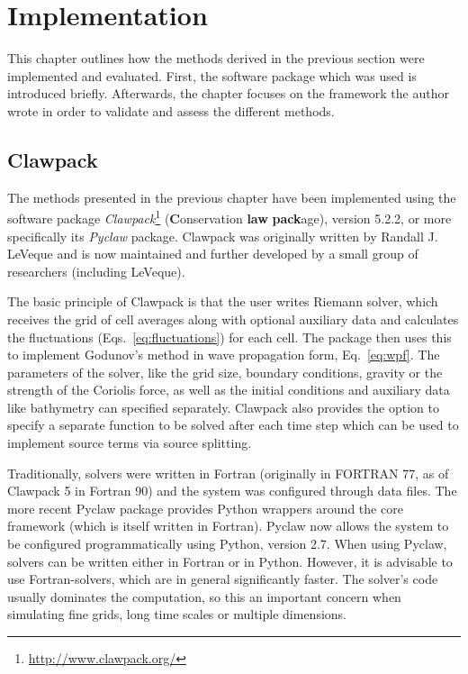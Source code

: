 \chapter{Implementation}
\label{ch:implementation}

This chapter outlines how the methods derived in the previous section were implemented and evaluated. First, the software package which was used is introduced briefly. Afterwards, the chapter focuses on the framework the author wrote in order to validate and assess the different methods.

\section{Clawpack}

The methods presented in the previous chapter have been implemented using the software package \emph{Clawpack}\footnote{\url{http://www.clawpack.org/}} (\textbf{C}onservation \textbf{law} \textbf{pack}age), version 5.2.2, or more specifically its \emph{Pyclaw} package. Clawpack was originally written by Randall J. LeVeque and is now maintained and further developed by a small group of researchers (including LeVeque).

The basic principle of Clawpack is that the user writes Riemann solver, which receives the grid of cell averages along with optional auxiliary data and calculates the fluctuations (Eqs.~\ref{eq:fluctuations}) for each cell. The package then uses this to implement Godunov's method in wave propagation form, Eq.~\ref{eq:wpf}. The parameters of the solver, like the grid size, boundary conditions, gravity or the strength of the Coriolis force, as well as the initial conditions and auxiliary data like bathymetry can specified separately. Clawpack also provides the option to specify a separate function to be solved after each time step which can be used to implement source terms via source splitting.

Traditionally, solvers were written in Fortran (originally in FORTRAN 77, as of Clawpack 5 in Fortran 90) and the system was configured through data files. The more recent Pyclaw package provides Python wrappers around the core framework (which is itself written in Fortran). Pyclaw now allows the system to be configured programmatically using Python, version 2.7. When using Pyclaw, solvers can be written either in Fortran or in Python. However, it is advisable to use Fortran-solvers, which are in general significantly faster. The solver's code usually dominates the computation, so this an important concern when simulating fine grids, long time scales or multiple dimensions.

